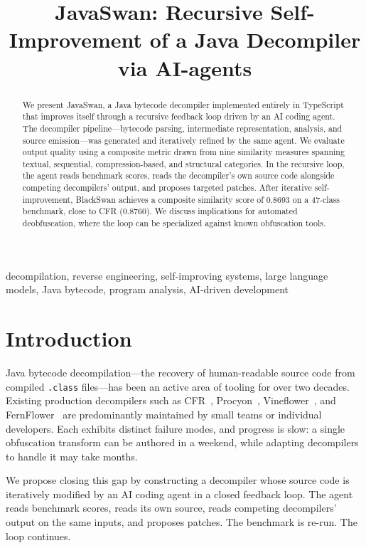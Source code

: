\documentclass[conference,11pt]{IEEEtran}
\title{JavaSwan: Recursive Self-Improvement of a Java Decompiler via AI-agents}
\author{
\IEEEauthorblockN{Shanyu Thibaut Juneja}
\IEEEauthorblockA{BlackSwan\\
\url{https://www.blackswan.sh}}
}
\begin{document}
\maketitle

\begin{abstract}
We present JavaSwan, a Java bytecode decompiler implemented entirely in TypeScript that improves itself through a recursive feedback loop driven by an AI coding agent. The decompiler pipeline---bytecode parsing, intermediate representation, analysis, and source emission---was generated and iteratively refined by the same agent. We evaluate output quality using a composite metric drawn from nine similarity measures spanning textual, sequential, compression-based, and structural categories. In the recursive loop, the agent reads benchmark scores, reads the decompiler's own source code alongside competing decompilers' output, and proposes targeted patches. After iterative self-improvement, BlackSwan achieves a composite similarity score of 0.8693 on a 47-class benchmark, close to CFR (0.8760). We discuss implications for automated deobfuscation, where the loop can be specialized against known obfuscation tools.
\end{abstract}

\begin{IEEEkeywords}
decompilation, reverse engineering, self-improving systems, large language models, Java bytecode, program analysis, AI-driven development
\end{IEEEkeywords}

\section{Introduction}
\label{sec:intro}

Java bytecode decompilation---the recovery of human-readable source code from compiled \texttt{.class} files---has been an active area of tooling for over two decades. Existing production decompilers such as CFR~\cite{cfr}, Procyon~\cite{procyon}, Vineflower~\cite{vineflower}, and FernFlower~\cite{fernflower} are predominantly maintained by small teams or individual developers. Each exhibits distinct failure modes, and progress is slow: a single obfuscation transform can be authored in a weekend, while adapting decompilers to handle it may take months.

We propose closing this gap by constructing a decompiler whose source code is iteratively modified by an AI coding agent in a closed feedback loop. The agent reads benchmark scores, reads its own source, reads competing decompilers' output on the same inputs, and proposes patches. The benchmark is re-run. The loop continues.
\end{document}
